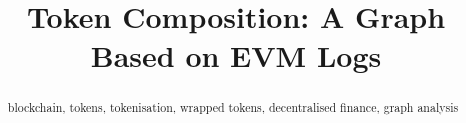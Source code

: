 \documentclass[conference]{IEEEtran}
\begin{document}
\title{Token Composition: A Graph Based on EVM Logs}


\maketitle

\begin{abstract}
  

  \begin{IEEEkeywords}
    blockchain, tokens, tokenisation, wrapped tokens, decentralised
    finance, graph analysis
  \end{IEEEkeywords}
\end{abstract}













\end{document}
